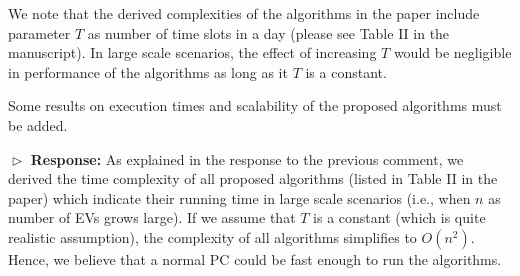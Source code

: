 \documentclass[11pt]{article}
\newcommand{\bt}[1]{{\color{black}#1}}%
\newcommand{\bt}[1]{#1}
\begin{document}
We note that the derived complexities of the algorithms in the paper include parameter $T$ as number of time slots in a day (please see Table II in the manuscript). In large scale scenarios, the effect of increasing $T$ would be negligible in performance of the algorithms as long as it $T$ is a constant. 


\vspace{3mm}
{\color{blue} Some results on execution times and scalability of the proposed algorithms must be added.
 }
\vspace{3mm}

$\vartriangleright$ \noindent\textbf{Response:} 
\bt{As explained in the response to the previous comment, we derived the time complexity of all proposed algorithms (listed in Table II in the paper) which indicate their running time in large scale scenarios (i.e., when $n$ as number of EVs grows large). If we assume that $T$ is a constant (which is quite realistic assumption), the complexity of all algorithms simplifies to $O(n^2)$. Hence, we believe that a normal PC could be fast enough to run the algorithms.}

%
\end{document}

